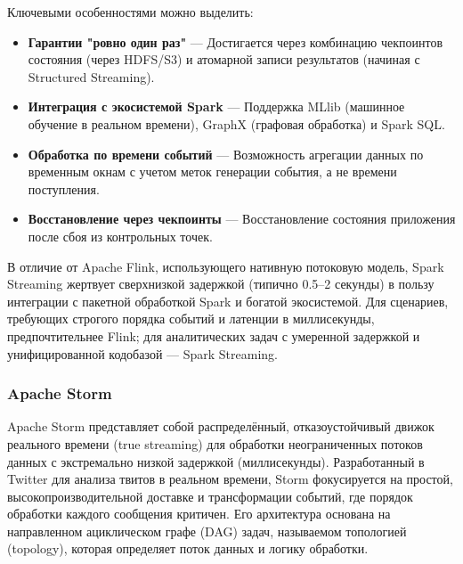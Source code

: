             
            Ключевыми особенностями можно выделить:
            \begin{itemize}
                \item \textbf{Гарантии "ровно один раз"} — Достигается через комбинацию чекпоинтов состояния (через HDFS/S3) и атомарной записи результатов (начиная с Structured Streaming).
                \item \textbf{Интеграция с экосистемой Spark} — Поддержка MLlib (машинное обучение в реальном времени), GraphX (графовая обработка) и Spark SQL.
                \item \textbf{Обработка по времени событий} — Возможность агрегации данных по временным окнам с учетом меток генерации события, а не времени поступления.
                \item \textbf{Восстановление через чекпоинты} — Восстановление состояния приложения после сбоя из контрольных точек.
            \end{itemize}
            
            
            В отличие от Apache Flink, использующего нативную потоковую модель, Spark Streaming жертвует сверхнизкой задержкой (типично 0.5–2 секунды) в пользу интеграции с пакетной обработкой Spark и богатой экосистемой. Для сценариев, требующих строгого порядка событий и латенции в миллисекунды, предпочтительнее Flink; для аналитических задач с умеренной задержкой и унифицированной кодобазой — Spark Streaming.

        \subsubsection{Apache Storm}
            Apache Storm представляет собой распределённый, отказоустойчивый движок реального времени (true streaming) для обработки неограниченных потоков данных с экстремально низкой задержкой (миллисекунды). Разработанный в Twitter для анализа твитов в реальном времени, Storm фокусируется на простой, высокопроизводительной доставке и трансформации событий, где порядок обработки каждого сообщения критичен. Его архитектура основана на направленном ациклическом графе (DAG) задач, называемом топологией (topology), которая определяет поток данных и логику обработки.
            
